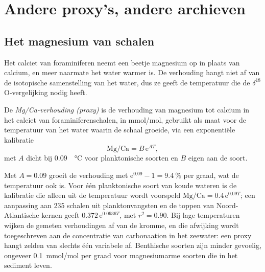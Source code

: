 \section{Andere proxy's, andere archieven}\label{sec:b2:climate-proxies:others}

\subsection*{Het magnesium van schalen}

Het calciet van foraminiferen neemt een beetje magnesium op in plaats van calcium, en meer naarmate
het water warmer is. De verhouding hangt niet af van de isotopische samenstelling van het water, dus ze
geeft de temperatuur die de $\delta^{18}$O-vergelijking nodig heeft.

\begin{definition}\label{def:b2:climate-proxies:mgca}
De \emph{Mg/Ca-verhouding (proxy)} is de verhouding van magnesium tot calcium in
het calciet van foraminiferenschalen, in \unit{mmol/mol}, gebruikt als maat voor de temperatuur van
het water waarin de schaal groeide, via een exponentiële kalibratie
\[
  \text{Mg/Ca} = B\,\mathrm{e}^{A T},
\]
met $A$ dicht bij \qty{0.09}{\per\celsius} voor planktonische soorten en $B$ eigen aan de soort.
\end{definition}

Met $A = 0.09$ groeit de verhouding met $\mathrm{e}^{0.09} - 1 = \qty{9.4}{\percent}$ per graad,
wat de temperatuur ook is. Voor één planktonische soort van koude wateren is de kalibratie die alleen uit de
temperatuur wordt voorspeld $\text{Mg/Ca} = 0.4\,\mathrm{e}^{0.09T}$; een aanpassing aan 235 schalen uit
planktonvangsten en de toppen van Noord-Atlantische kernen geeft $0.372\,\mathrm{e}^{0.0936T}$, met $r^2 = 0.90$.
Bij lage temperaturen wijken de gemeten verhoudingen af van de kromme, en die afwijking wordt toegeschreven aan
de concentratie van carbonaation in het zeewater: een proxy hangt zelden van slechts één variabele af.
Benthische soorten zijn minder gevoelig, ongeveer \qty{0.1}{mmol/mol} per graad voor magnesiumarme
soorten die in het sediment leven.

